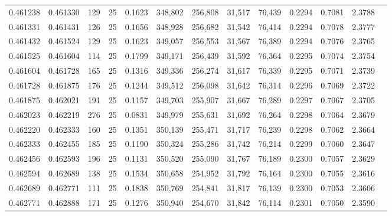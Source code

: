\begin{tabular}{rrrrrrrrrrrrr}
0.461238 & 0.461330 &   129 &  25 &                                     0.1623 & 348,802 & 256,808 &  31,517 &  76,439 & 0.2294 & 0.7081 & 2.3788 \\
0.461331 & 0.461431 &   126 &  25 &                                     0.1656 & 348,928 & 256,682 &  31,542 &  76,414 & 0.2294 & 0.7078 & 2.3777 \\
0.461432 & 0.461524 &   129 &  25 &                                     0.1623 & 349,057 & 256,553 &  31,567 &  76,389 & 0.2294 & 0.7076 & 2.3765 \\
0.461525 & 0.461604 &   114 &  25 &                                     0.1799 & 349,171 & 256,439 &  31,592 &  76,364 & 0.2295 & 0.7074 & 2.3754 \\
0.461604 & 0.461728 &   165 &  25 &                                     0.1316 & 349,336 & 256,274 &  31,617 &  76,339 & 0.2295 & 0.7071 & 2.3739 \\
0.461728 & 0.461875 &   176 &  25 &                                     0.1244 & 349,512 & 256,098 &  31,642 &  76,314 & 0.2296 & 0.7069 & 2.3722 \\
0.461875 & 0.462021 &   191 &  25 &                                     0.1157 & 349,703 & 255,907 &  31,667 &  76,289 & 0.2297 & 0.7067 & 2.3705 \\
0.462023 & 0.462219 &   276 &  25 &                                     0.0831 & 349,979 & 255,631 &  31,692 &  76,264 & 0.2298 & 0.7064 & 2.3679 \\
0.462220 & 0.462333 &   160 &  25 &                                     0.1351 & 350,139 & 255,471 &  31,717 &  76,239 & 0.2298 & 0.7062 & 2.3664 \\
0.462333 & 0.462455 &   185 &  25 &                                     0.1190 & 350,324 & 255,286 &  31,742 &  76,214 & 0.2299 & 0.7060 & 2.3647 \\
0.462456 & 0.462593 &   196 &  25 &                                     0.1131 & 350,520 & 255,090 &  31,767 &  76,189 & 0.2300 & 0.7057 & 2.3629 \\
0.462594 & 0.462689 &   138 &  25 &                                     0.1534 & 350,658 & 254,952 &  31,792 &  76,164 & 0.2300 & 0.7055 & 2.3616 \\
0.462689 & 0.462771 &   111 &  25 &                                     0.1838 & 350,769 & 254,841 &  31,817 &  76,139 & 0.2300 & 0.7053 & 2.3606 \\
0.462771 & 0.462888 &   171 &  25 &                                     0.1276 & 350,940 & 254,670 &  31,842 &  76,114 & 0.2301 & 0.7050 & 2.3590 \\

\end{tabular}
